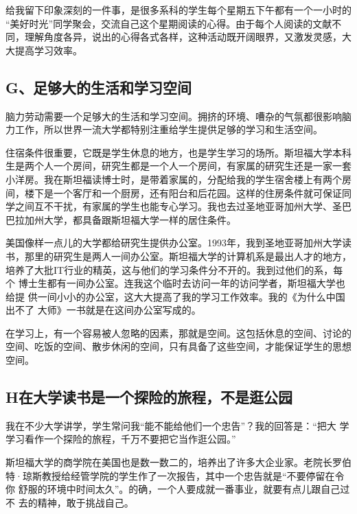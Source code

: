 \documentclass[11pt]{ctexart}
\begin{document}
{{{{给我留下印象深刻的一件事，是很多系科的学生每个星期五下午都有一个一小时的
“美好时光”同学聚会，交流自己这个星期阅读的心得。由于每个人阅读的文献不
同，理解角度各异，说出的心得各式各样，这种活动既开阔眼界，又激发灵感，大
大提高学习效率。




\subsection{G、足够大的生活和学习空间}
\label{sec:org61434fe}

脑力劳动需要一个足够大的生活和学习空间。拥挤的环境、嘈杂的气氛都很影响脑
力工作，所以世界一流大学都特别注重给学生提供足够的学习和生活空间。


住宿条件很重要，它既是学生休息的地方，也是学生学习的场所。斯坦福大学本科
生是两个人一个房间，研究生都是一个人一个房间，有家属的研究生还是一家一套
小洋房。我在斯坦福读博士时，是带着家属的，分配给我的学生宿舍楼上有两个房
间，楼下是一个客厅和一个厨房，还有阳台和后花园。这样的住房条件就可保证同
学之间互不干扰，有家属的学生也能专心学习。我也去过圣地亚哥加州大学、圣巴
巴拉加州大学，都具备跟斯坦福大学一样的居住条件。


美国像样一点儿的大学都给研究生提供办公室。1993年，我到圣地亚哥加州大学读
书，那里的研究生是两人一间办公室。斯坦福大学的计算机系是最出人才的地方，
培养了大批IT行业的精英，这与他们的学习条件分不开的。我到过他们的系，每个
博士生都有一间办公室。连我这个临时去访问一年的访问学者，斯坦福大学也给提
供一间小小的办公室，这大大提高了我的学习工作效率。我的《为什么中国出不了
大师》一书就是在这间办公室写成的。


在学习上，有一个容易被人忽略的因素，那就是空间。这包括休息的空间、讨论的
空间、吃饭的空间、散步休闲的空间，只有具备了这些空间，才能保证学生的思想
空间。




\subsection{H在大学读书是一个探险的旅程，不是逛公园}
\label{sec:org9c1b88e}

我在不少大学讲学，学生常问我“能不能给他们一个忠告”？我的回答是：“把大
学学习看作一个探险的旅程，千万不要把它当作逛公园。”


斯坦福大学的商学院在美国也是数一数二的，培养出了许多大企业家。老院长罗伯
特·琼斯教授给经管学院的学生作了一次报告，其中一个忠告就是“不要停留在令你
舒服的环境中时间太久”。的确，一个人要成就一番事业，就要有点儿跟自己过不
去的精神，敢于挑战自己。


}}}}
\end{document}
